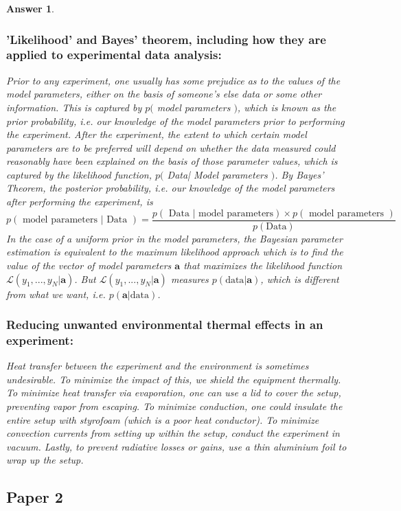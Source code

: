 \documentclass[a4paper]{article}
\newtheorem{ans}{Answer}[subsection]
\theoremstyle{new}
\begin{document}
\begin{ans}
\subsubsection*{'Likelihood' and Bayes' theorem, including how they are applied to experimental data analysis:}
Prior to any experiment, one usually has some prejudice as to the values of the model parameters, either on the basis of someone's else data or some other information. This is captured by $p($ model parameters $)$, which is known as the prior probability, i.e. our knowledge of the model parameters prior to performing the experiment. After the experiment, the extent to which certain model parameters are to be preferred will depend on whether the data measured could reasonably have been explained on the basis of those parameter values, which is captured by the likelihood function, $p($ Data| Model parameters $)$. By Bayes' Theorem, the posterior probability, i.e. our knowledge of the model parameters after performing the experiment, is
$$p(\text{ model parameters | Data })=\frac{p(\text{ Data | model parameters})\times p(\text{ model parameters })}{p(\text{Data})}$$
In the case of a uniform prior in the model parameters, the Bayesian parameter estimation is equivalent to the maximum likelihood approach which is to find the value of the vector of model parameters $\mathbf{a}$ that maximizes the likelihood function $\mathcal{L}(y_1,...,y_N|\mathbf{a})$. But $\mathcal{L}(y_1,...,y_N|\mathbf{a})$ measures $p(\text{data}|\mathbf{a})$, which is different from what we want, i.e. $p(\mathbf{a}|\text{data})$. 
\subsubsection*{Reducing unwanted environmental thermal effects in an experiment:}
Heat transfer between the experiment and the environment is sometimes undesirable. To minimize the impact of this, we shield the equipment thermally. To minimize heat transfer via evaporation, one can use a lid to cover the setup, preventing vapor from escaping. To minimize conduction, one could insulate the entire setup with styrofoam (which is a poor heat conductor). To minimize convection currents from setting up within the setup, conduct the experiment in vacuum. Lastly, to prevent radiative losses or gains, use a thin aluminium foil to wrap up the setup.
\end{ans}
\newpage
\subsection{Paper 2}
\end{document}
